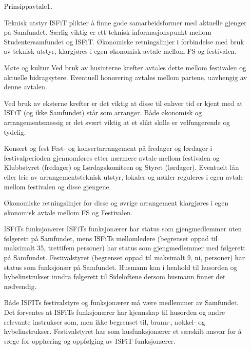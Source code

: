 \begin{instruks}{Prinsippavtale}{1. }{ }
    \begin{instruksledd}{Teknisk utstyr}
        ISFiT plikter å finne gode samarbeidsformer med aktuelle gjenger på Samfundet. Særlig viktig er ett
        teknisk
        informasjonspunkt mellom Studentersamfundet og ISFiT. Økonomiske retningslinjer i forbindelse med
        bruk av
        teknisk utstyr, klargjøres i egen økonomisk avtale mellom FS og festivalen.
    \end{instruksledd}

    \begin{instruksledd}{Møte og kultur}
        Ved bruk av husinterne krefter avtales dette mellom festivalen og aktuelle bidragsytere. Eventuell
        honorering avtales
        mellom partene, uavhengig av denne avtalen.

        Ved bruk av eksterne krefter er det viktig at disse til enhver tid er kjent med at ISFiT (og ikke
        Samfundet) står som
        arrangør. Både økonomisk og arrangementsmessig er det svært viktig at et slikt skille er
        velfungerende og tydelig.
    \end{instruksledd}

    \begin{instruksledd}{Konsert og fest}
        Fest- og konsertarrangement på fredager og lørdager i festivalperioden gjennomføres etter nærmere
        avtale mellom
        festivalen og Klubbstyret (fredager) og Lørdagskomiteen og Styret (lørdager). Eventuelt lån eller
        leie av
        arrangementsteknisk utstyr, lokaler og nøkler reguleres i egen avtale mellom festivalen og disse
        gjengene.

        Økonomiske retningslinjer for disse og øvrige arrangement klargjøres i egen økonomisk avtale mellom
        FS og
        Festivalen.
    \end{instruksledd}

    \begin{instruksledd}{ISFiTs funksjonærer} 
        ISFiTs funksjonærer har status som gjengmedlemmer uten følgerett på Samfundet, mens ISFiTs
        mellomledere
        (begrenset oppad til maksimalt 35, trettifem personer) har status som gjengmedlemmer med følgerett
        på Samfundet.
        Festivalstyret (begrenset oppad til maksimalt 9, ni, personer) har status som funksjonær på
        Samfundet. Husmann kan i
        henhold til husorden og hybelinstrukser inndra følgerett til Sideloftene dersom husmann finner det
        nødvendig.

        Både ISFITs festivalstyre og funksjonærer må være medlemmer av Samfundet. Det forventes at ISFiTs
        funksjonærer
        har kjennskap til husorden og andre relevante instrukser som, men ikke begrenset til, brann-,
        nøkkel- og
        hybelinstrukser. Festivalstyret har som husfunksjonærer et særskilt ansvar for å sørge for opplæring
        og oppfølging av
        ISFiT-funksjonærer.


\end{instruksledd}
\end{instruks}
